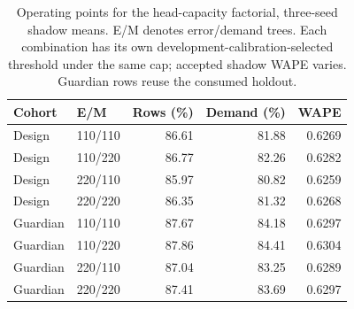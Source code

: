 \begin{table}[htbp]
\centering\small
\caption{Operating points for the head-capacity factorial, three-seed shadow means. E/M denotes error/demand trees. Each combination has its own development-calibration-selected threshold under the same cap; accepted shadow WAPE varies. Guardian rows reuse the consumed holdout.}
\label{tab:headrisk}
\begin{tabular}{llrrr}\toprule
Cohort & E/M & Rows (\%) & Demand (\%) & WAPE\\\midrule
Design & 110/110 & 86.61 & 81.88 & 0.6269 \\
Design & 110/220 & 86.77 & 82.26 & 0.6282 \\
Design & 220/110 & 85.97 & 80.82 & 0.6259 \\
Design & 220/220 & 86.35 & 81.32 & 0.6268 \\
Guardian & 110/110 & 87.67 & 84.18 & 0.6297 \\
Guardian & 110/220 & 87.86 & 84.41 & 0.6304 \\
Guardian & 220/110 & 87.04 & 83.25 & 0.6289 \\
Guardian & 220/220 & 87.41 & 83.69 & 0.6297 \\
\bottomrule\end{tabular}
\end{table}

